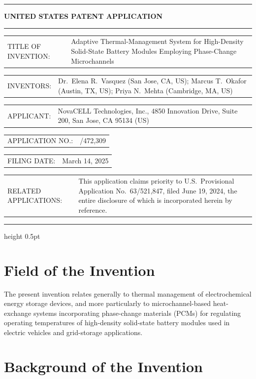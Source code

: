 \documentclass[12pt,letterpaper]{article}
\makeatletter
\newcommand{\titlerow}[2]{%
  \noindent\begin{tabularx}{\linewidth}{%
    @{}>{{\color{muted}\small\bfseries}}l@{\hspace{7mm}}>{\raggedright\arraybackslash}X@{}%
  }%
    #1 & #2 \\
  \end{tabularx}%
  \vspace{2pt}%
}
\makeatother
\begin{document}
\vspace*{4pt}
{\centering
  {\color{accent}\rule{\linewidth}{1.2pt}}\par\vspace{8pt}%
  {\Large\bfseries\color{accent} UNITED STATES PATENT APPLICATION}\par\vspace{6pt}
  {\color{accent}\rule{\linewidth}{0.5pt}}\par
}
\vspace{16pt}

\titlerow{TITLE OF INVENTION:}{Adaptive Thermal-Management System for High-Density
  Solid-State Battery Modules Employing Phase-Change Microchannels}
\vspace{4pt}
\titlerow{INVENTORS:}{Dr.~Elena R.~Vasquez (San Jose, CA, US);
  Marcus T.~Okafor (Austin, TX, US);
  Priya N.~Mehta (Cambridge, MA, US)}
\titlerow{APPLICANT:}{NovaCELL Technologies, Inc., 4850 Innovation Drive, Suite 200,
  San Jose, CA 95134 (US)}
\titlerow{APPLICATION NO.:}{18/472,309}
\titlerow{FILING DATE:}{March 14, 2025}
\titlerow{RELATED APPLICATIONS:}{This application claims priority to U.S.\ Provisional
  Application No.~63/521,847, filed June 19, 2024, the entire disclosure of
  which is incorporated herein by reference.}

\vspace{14pt}
{\color{colrule}\hrule height 0.5pt}
\vspace{14pt}

\section{Field of the Invention}

The present invention relates generally to thermal management of electrochemical energy
storage devices, and more particularly to microchannel-based heat-exchange systems
incorporating phase-change materials (PCMs) for regulating operating temperatures of
high-density solid-state battery modules used in electric vehicles and grid-storage
applications.

\section{Background of the Invention}
\end{document}
